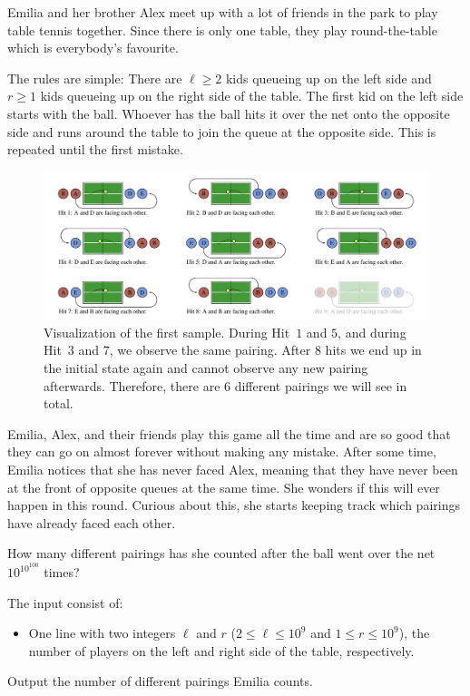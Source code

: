 \problemname{}

Emilia and her brother Alex meet up with a lot of friends in the park to play table tennis together.
Since there is only one table, they play round-the-table which is everybody's favourite.

The rules are simple:
There are $\ell \geq 2$ kids queueing up on the left side and $r \geq 1$ kids queueing up on the right side of the table.
The first kid on the left side starts with the ball.
Whoever has the ball hits it over the net onto the opposite side and runs around the table to join the queue at the opposite side.
This is repeated until the first mistake.

\begin{figure}[h]
	\centering
	\includegraphics[width=\textwidth]{sample}
	\caption{Visualization of the first sample.
		During Hit~$1$ and $5$, and during Hit~$3$ and $7$, we observe the same pairing.
		After $8$ hits we end up in the initial state again and cannot observe any new pairing afterwards.
		Therefore, there are $6$ different pairings we will see in total.
	}
\end{figure}

Emilia, Alex, and their friends play this game all the time and are so good that they can go on almost forever without making any mistake.
After some time, Emilia notices that she has never faced Alex, meaning that they have never been at the front of opposite queues at the same time.
She wonders if this will ever happen in this round.
Curious about this, she starts keeping track which pairings have already faced each other.

How many different pairings has she counted after the ball went over the net $10^{10^{100}}$ times?

\begin{Input}
	The input consist of:
	\begin{itemize}
		\item One line with two integers $\ell$ and $r$ ($2 \leq \ell \leq 10^{9}$ and $1 \leq r \leq 10^{9}$), the number of players on the left and right side of the table, respectively.
	\end{itemize}
\end{Input}

\begin{Output}
	Output the number of different pairings Emilia counts.
\end{Output}
